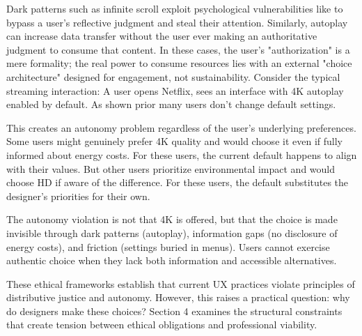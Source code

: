 \par Dark patterns such as infinite scroll exploit psychological vulnerabilities like to bypass a user's reflective judgment and steal their attention. Similarly, autoplay can increase data transfer without the user ever making an authoritative judgment to consume that content. In these cases, the user's "authorization" is a mere formality; the real power to consume resources lies with an external "choice architecture" designed for engagement, not sustainability. Consider the typical streaming interaction: A user opens Netflix, sees an interface with 4K autoplay enabled by default. As shown prior many users don't change default settings.

This creates an autonomy problem regardless of the user's underlying preferences.
Some users might genuinely prefer 4K quality and would choose it even if fully
informed about energy costs. For these users, the current default happens to
align with their values. But other users prioritize environmental impact and
would choose HD if aware of the difference. For these users, the default
substitutes the designer's priorities for their own.

The autonomy violation is not that 4K is offered, but that the choice is made
invisible through dark patterns (autoplay), information gaps (no disclosure of
energy costs), and friction (settings buried in menus). Users cannot exercise
authentic choice when they lack both information and accessible alternatives.

\par These ethical frameworks establish that current UX practices violate principles
of distributive justice and autonomy. However, this raises a practical question:
why do designers make these choices? Section 4 examines the structural constraints
that create tension between ethical obligations and professional viability.
